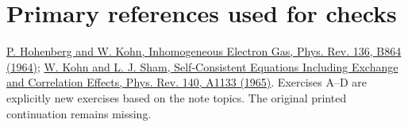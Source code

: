 \section*{Primary references used for checks}
\href{https://journals.aps.org/pr/abstract/10.1103/PhysRev.136.B864}{P. Hohenberg and W. Kohn, Inhomogeneous Electron Gas, Phys. Rev. 136, B864 (1964)};
\href{https://journals.aps.org/pr/abstract/10.1103/PhysRev.140.A1133}{W. Kohn and L. J. Sham, Self-Consistent Equations Including Exchange and Correlation Effects, Phys. Rev. 140, A1133 (1965)}.
Exercises A--D are explicitly new exercises based on the note topics. The original printed continuation remains missing.
